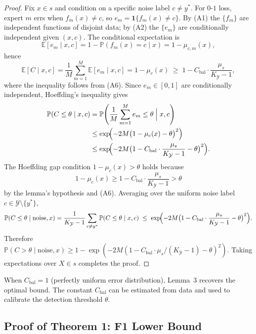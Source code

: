 \begin{proof}
Fix $x \in s$ and condition on a specific noise label $c \neq y^*$. For
$0$-$1$ loss, expert $m$ errs when $f_m(x) \neq c$, so
$e_m = \mathbf{1}\{f_m(x) \neq c\}$. By (A1) the $\{f_m\}$ are independent
functions of disjoint data; by (A2) the $\{e_m\}$ are conditionally independent
given $(x,c)$. The conditional expectation is
\[
\mathbb{E}[e_m \mid x, c] = 1 - \mathbb{P}(f_m(x) = c \mid x)
= 1 - \mu_{c,m}(x),
\]
hence
\[
\mathbb{E}[C \mid x, c]
= \frac{1}{M}\sum_{m=1}^M \mathbb{E}[e_m \mid x, c]
= 1 - \mu_c(x)
\;\geq\; 1 - C_{\text{bal}}\cdot\frac{\mu_s}{K_{\mathcal{Y}}-1},
\]
where the inequality follows from (A6). Since $e_m \in [0,1]$ are conditionally
independent, Hoeffding's inequality gives
\begin{align*}
\mathbb{P}(C \leq \theta \mid x, c)
&= \mathbb{P}\!\left(\frac{1}{M}\sum_{m=1}^M e_m \leq \theta
   \;\Big|\; x, c\right) \\
&\leq \exp\!\Bigl(-2M\bigl(1 - \mu_c(x) - \theta\bigr)^2\Bigr) \\
&\leq \exp\!\Bigl(-2M\bigl(1 - C_{\text{bal}}\cdot\frac{\mu_s}{K_{\mathcal{Y}}-1}
   - \theta\bigr)^2\Bigr).
\end{align*}
The Hoeffding gap condition $1 - \mu_c(x) > \theta$ holds because
\[
1 - \mu_c(x) \geq 1 - C_{\text{bal}}\cdot\frac{\mu_s}{K_{\mathcal{Y}}-1}
> \theta
\]
by the lemma's hypothesis and (A6). Averaging over the uniform noise label
$c \in \mathcal{Y}\setminus\{y^*\}$,
\[
\mathbb{P}(C \leq \theta \mid \text{noise}, x)
= \frac{1}{K_{\mathcal{Y}}-1}\sum_{c \neq y^*}
  \mathbb{P}(C \leq \theta \mid x, c)
\;\leq\; \exp\!\Bigl(-2M\bigl(1 - C_{\text{bal}}\cdot\frac{\mu_s}{K_{\mathcal{Y}}-1}
  - \theta\bigr)^2\Bigr).
\]
Therefore $\mathbb{P}(C > \theta \mid \text{noise}, x)
\geq 1 - \exp(-2M(1 - C_{\text{bal}}\cdot\mu_s/(K_{\mathcal{Y}}-1)
- \theta)^2)$. Taking expectations over $X \in s$ completes the proof.
\end{proof}

\begin{remark}
When $C_{\text{bal}} = 1$ (perfectly uniform error distribution), Lemma~3
recovers the optimal bound. The constant $C_{\text{bal}}$ can be estimated from
data and used to calibrate the detection threshold $\theta$.
\end{remark}

\subsection{Proof of Theorem 1: F1 Lower Bound}
\label{sec:thm1:proof}

